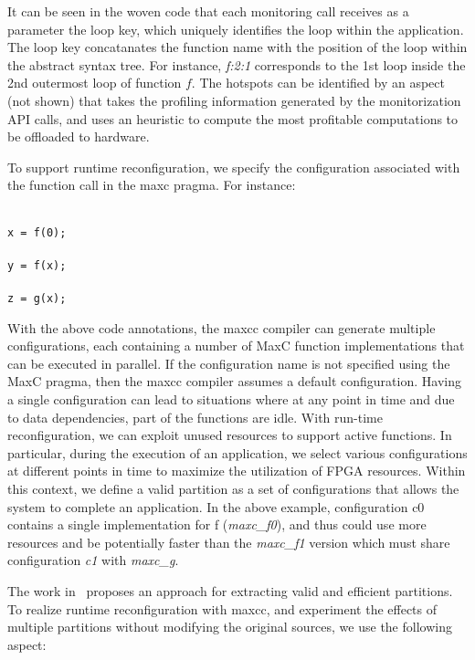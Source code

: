 \noindent It can be seen in the woven code that each monitoring call receives as a parameter the loop key, which uniquely identifies the loop within the application. The loop key concatanates the function name with the position of the loop within the abstract syntax tree. For instance, \emph{f:2:1} corresponds to the 1st loop inside the 2nd outermost loop of function $f$. The hotspots can be identified by an aspect (not shown) that takes the profiling information generated by the monitorization API calls, and uses an heuristic to compute the most profitable computations to be offloaded to hardware.

To support runtime reconfiguration, we specify the configuration associated with the function call in the maxc pragma. For instance:

\noindent\texttt{\footnotesize{\\
x = f(0); \\
\\
y = f(x); \\
\\
z = g(x); \\
}}

\noindent With the above code annotations, the maxcc compiler can generate multiple configurations, each containing  a number of MaxC function implementations that can be executed in parallel. If the configuration name is not specified using the MaxC pragma, then the maxcc compiler assumes a default configuration. Having a single configuration can lead to situations where at any point in time and due to data dependencies, part of the functions are idle. With run-time reconfiguration, we can exploit unused resources to support active functions. In particular, during the execution of an application, we select various configurations at different points in time to maximize the utilization of FPGA resources. Within this context, we define a valid partition as a set of configurations that allows the system to complete an application. In the above example, configuration c0 contains a single implementation for f (\emph{maxc\_f0}), and thus could use more resources and be potentially faster than the \emph{maxc\_f1} version which must share configuration \emph{c1} with \emph{maxc\_g}. 

The work in~\cite{Xinyu:Qiwei:Luk:Qiang:Pell:2012} proposes an approach for extracting valid and efficient partitions. To realize runtime reconfiguration with maxcc, and experiment the effects of multiple partitions without modifying the original sources, we use the following aspect:

